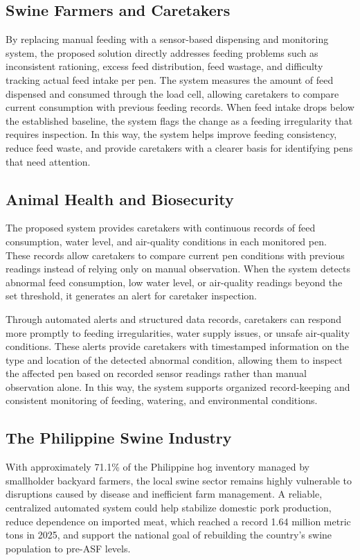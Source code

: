 \subsection*{Swine Farmers and Caretakers}
By replacing manual feeding with a sensor-based dispensing and monitoring system, the proposed solution directly addresses feeding problems such as inconsistent rationing, excess feed distribution, feed wastage, and difficulty tracking actual feed intake per pen. The system measures the amount of feed dispensed and consumed through the load cell, allowing caretakers to compare current consumption with previous feeding records. When feed intake drops below the established baseline, the system flags the change as a feeding irregularity that requires inspection. In this way, the system helps improve feeding consistency, reduce feed waste, and provide caretakers with a clearer basis for identifying pens that need attention.

\subsection*{Animal Health and Biosecurity}
The proposed system provides caretakers with continuous records of feed consumption, water level, and air-quality conditions in each monitored pen. These records allow caretakers to compare current pen conditions with previous readings instead of relying only on manual observation. When the system detects abnormal feed consumption, low water level, or air-quality readings beyond the set threshold, it generates an alert for caretaker inspection.

Through automated alerts and structured data records, caretakers can respond more promptly to feeding irregularities, water supply issues, or unsafe air-quality conditions. These alerts provide caretakers with timestamped information on the type and location of the detected abnormal condition, allowing them to inspect the affected pen based on recorded sensor readings rather than manual observation alone. In this way, the system supports organized record-keeping and consistent monitoring of feeding, watering, and environmental conditions.

\subsection*{The Philippine Swine Industry}
With approximately 71.1\% of the Philippine hog inventory managed by smallholder backyard farmers, the local swine sector remains highly vulnerable to disruptions caused by disease and inefficient farm management. A reliable, centralized automated system could help stabilize domestic pork production, reduce dependence on imported meat, which reached a record 1.64 million metric tons in 2025, and support the national goal of rebuilding the country's swine population to pre-ASF levels.

